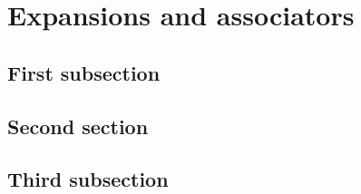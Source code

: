 \chapter{Expansions and associators}

\section{First subsection}

\section{Second section}

\section{Third subsection}
